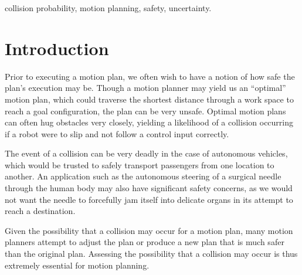 \documentclass[journal]{IEEEtran}
\begin{document}
\begin{IEEEkeywords}
 collision probability, motion planning, safety, uncertainty.
\end{IEEEkeywords}

%
\IEEEpeerreviewmaketitle


\section{Introduction}
% 
% 
% 
% 
Prior to executing a motion plan, we often wish to have a notion of how safe the plan's execution may be. Though a motion planner may yield us an ``optimal'' motion plan, which could traverse the shortest distance through a work space to reach a goal configuration, the plan can be very unsafe. Optimal motion plans can often hug obstacles very closely, yielding a likelihood of a collision occurring if a robot were to slip and not follow a control input correctly.

The event of a collision can be very deadly in the case of autonomous vehicles, which would be trusted to safely transport passengers from one location to another. An application such as the autonomous steering of a surgical needle through the human body may also have significant safety concerns, as we would not want the needle to forcefully jam itself into delicate organs in its attempt to reach a destination.

Given the possibility that a collision may occur for a motion plan, many motion planners attempt to adjust the plan or produce a new plan that is much safer than the original plan. Assessing the possibility that a collision may occur is thus extremely essential for motion planning.
\end{document}
